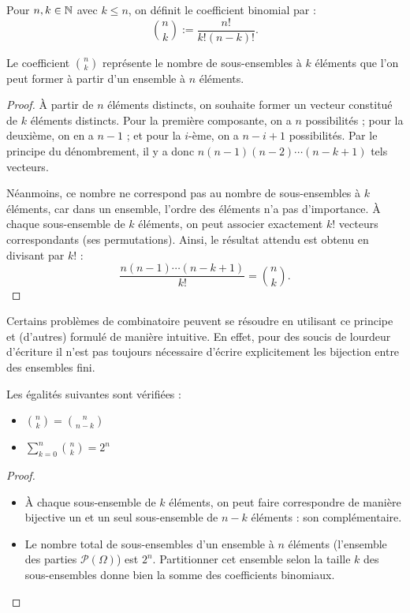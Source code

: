 \begin{notation}
     Pour $n, k \in \mathbb{N}$ avec $k\le n$, on définit le coefficient binomial par :
     \[
     \binom{n}{k} := \frac{n!}{k!(n-k)!}.
     \]
 \end{notation}

 \begin{proposition}
     Le coefficient $\binom{n}{k}$ représente le nombre de sous-ensembles à $k$ éléments que l'on peut former à partir d'un ensemble à $n$ éléments.
 \end{proposition}

 \begin{proof}
    À partir de $n$ éléments distincts, on souhaite former un vecteur constitué de $k$ éléments distincts. Pour la première composante, on a $n$ possibilités ; pour la deuxième, on en a $n-1$ ; et pour la $i$-ème, on a $n-i+1$ possibilités. 
    Par le principe du dénombrement, il y a donc $n(n-1)(n-2)\dotsm(n-k+1)$ tels vecteurs. 
    
    Néanmoins, ce nombre ne correspond pas au nombre de sous-ensembles à $k$ éléments, car dans un ensemble, l'ordre des éléments n'a pas d'importance. À chaque sous-ensemble de $k$ éléments, on peut associer exactement $k!$ vecteurs correspondants (ses permutations). Ainsi, le résultat attendu est obtenu en divisant par $k!$ :
    \[
    \frac{n(n-1)\dotsm(n-k+1)}{k!} = \binom{n}{k}.
    \]
 \end{proof}

\begin{remarque}
    Certains problèmes de combinatoire peuvent se résoudre en utilisant ce principe et (d'autres) formulé de manière intuitive. En effet, pour des soucis de lourdeur d'écriture il n'est pas toujours nécessaire d'écrire explicitement les bijection entre des ensembles fini.
\end{remarque}

\begin{proposition}
    Les égalités suivantes sont vérifiées :
    \begin{itemize}
        \item $\displaystyle \binom{n}{k} = \binom{n}{n-k}$
        \item $\displaystyle \sum_{k = 0}^n \binom{n}{k} = 2^n$
    \end{itemize}
\end{proposition}

\begin{proof}
    \begin{itemize}
        \item À chaque sous-ensemble de $k$ éléments, on peut faire correspondre de manière bijective un et un seul sous-ensemble de $n-k$ éléments : son complémentaire.
        \item Le nombre total de sous-ensembles d'un ensemble à $n$ éléments (l'ensemble des parties $\mathcal{P}(\Omega)$) est $2^n$. Partitionner cet ensemble selon la taille $k$ des sous-ensembles donne bien la somme des coefficients binomiaux. 
    \end{itemize}
\end{proof}

